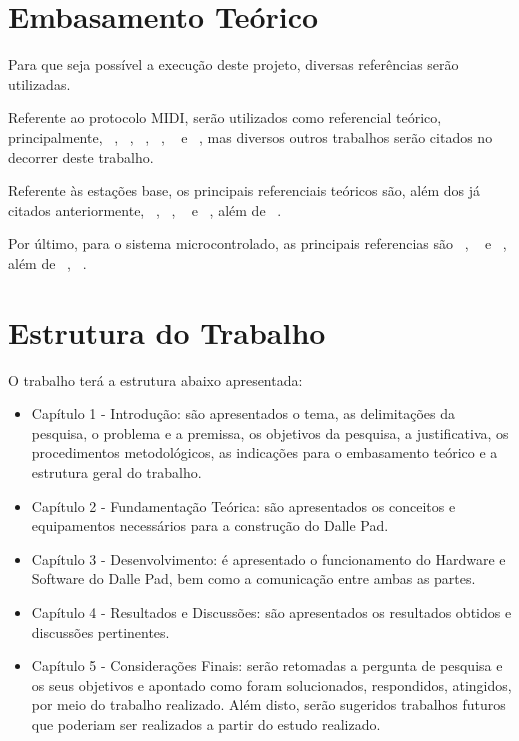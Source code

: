     \section{Embasamento Teórico}

        Para que seja possível a execução deste projeto, diversas referências serão utilizadas.
        
        Referente ao protocolo MIDI, serão utilizados como referencial teórico, principalmente, ~\cite{Alves}, ~\cite{Hewitt}, ~\cite{Colbeck}, ~\cite{Guerin}, ~\cite{McGuire} e ~\cite{Huber}, mas diversos outros trabalhos serão citados no decorrer deste trabalho.
        
        Referente às estações base, os principais referenciais teóricos são, além dos já citados anteriormente, ~\cite{Ballou}, ~\cite{Gregoire}, ~\cite{Jackson} e ~\cite{Hass}, além de ~\cite{AndroidDeveloper}.
        
        Por último, para o sistema microcontrolado, as principais referencias são ~\cite{Wheat}, ~\cite{Bayle} e ~\cite{Ghassaei}, além de ~\cite{Arduino2014}, ~\cite{ArduinoRef2014}.

    \section{Estrutura do Trabalho}

        O trabalho terá a estrutura abaixo apresentada:

        \begin{itemize}
          \item Capítulo 1 - Introdução: são apresentados o tema, as delimitações da pesquisa, o problema e a premissa, os objetivos da pesquisa, a justificativa, os procedimentos metodológicos, as indicações para o embasamento teórico e a estrutura geral do trabalho.

          \item Capítulo 2 - Fundamentação Teórica: são apresentados os conceitos e equipamentos necessários para a construção do Dalle Pad.

          \item Capítulo 3 - Desenvolvimento: é apresentado o funcionamento do Hardware e Software do Dalle Pad, bem como a comunicação entre ambas as partes.

          \item Capítulo 4 - Resultados e Discussões: são apresentados os resultados obtidos e discussões pertinentes.

          \item Capítulo 5 - Considerações Finais: serão retomadas a pergunta de pesquisa e os seus objetivos e apontado como foram solucionados, respondidos, atingidos, por meio do trabalho realizado. Além disto, serão sugeridos trabalhos futuros que poderiam ser realizados a partir do estudo realizado.
        \end{itemize}

